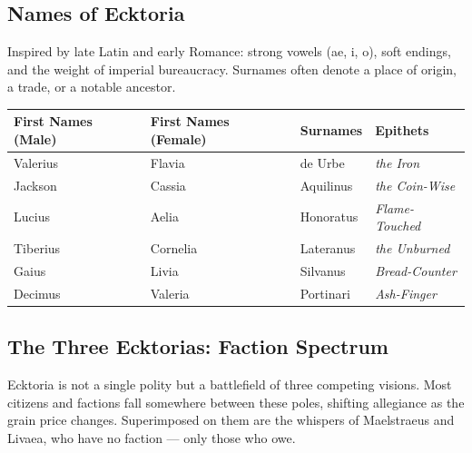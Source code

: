 \subsection*{Names of Ecktoria}
Inspired by late Latin and early Romance: strong vowels (ae, i, o), soft endings, and the weight of imperial bureaucracy. Surnames often denote a place of origin, a trade, or a notable ancestor.

\begin{longtable}{|p{}|p{}|p{}|p{}|}
\hline
\textbf{First Names (Male)} & \textbf{First Names (Female)} & \textbf{Surnames} & \textbf{Epithets} \\
\hline
Valerius & Flavia & de Urbe & \textit{the Iron} \\
\hline
Jackson & Cassia & Aquilinus & \textit{the Coin-Wise} \\
\hline
Lucius & Aelia & Honoratus & \textit{Flame-Touched} \\
\hline
Tiberius & Cornelia & Lateranus & \textit{the Unburned} \\
\hline
Gaius & Livia & Silvanus & \textit{Bread-Counter} \\
\hline
Decimus & Valeria & Portinari & \textit{Ash-Finger} \\
\hline
\end{longtable}

\subsection*{The Three Ecktorias: Faction Spectrum}
Ecktoria is not a single polity but a battlefield of three competing visions. Most citizens and factions fall somewhere between these poles, shifting allegiance as the grain price changes. Superimposed on them are the whispers of Maelstraeus and Livaea, who have no faction --- only those who owe.

